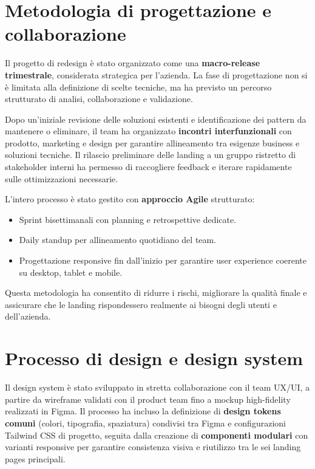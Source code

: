 \section{Metodologia di progettazione e collaborazione}
Il progetto di redesign è stato organizzato come una \textbf{macro-release trimestrale},
considerata strategica per l'azienda. La fase di progettazione non si è limitata
alla definizione di scelte tecniche, ma ha previsto un percorso strutturato di
analisi, collaborazione e validazione.

Dopo un'iniziale revisione delle soluzioni esistenti e identificazione dei 
pattern da mantenere o eliminare, il team ha organizzato \textbf{incontri 
interfunzionali} con prodotto, marketing e design per garantire allineamento 
tra esigenze business e soluzioni tecniche. Il rilascio preliminare delle 
landing a un gruppo ristretto di stakeholder interni ha permesso di raccogliere 
feedback e iterare rapidamente sulle ottimizzazioni necessarie.

L'intero processo è stato gestito con \textbf{approccio Agile} strutturato:

\begin{itemize}
  \item Sprint bisettimanali con planning e retrospettive dedicate.
  \item Daily standup per allineamento quotidiano del team.
  \item Progettazione responsive fin dall'inizio per garantire user experience 
        coerente su desktop, tablet e mobile.
\end{itemize}

Questa metodologia ha consentito di ridurre i rischi, migliorare la qualità
finale e assicurare che le landing rispondessero realmente ai bisogni degli utenti
e dell'azienda.

\section{Processo di design e design system}
Il design system è stato sviluppato in stretta collaborazione con il team UX/UI,
a partire da wireframe validati con il product team fino a mockup
high-fidelity realizzati in Figma. Il processo ha incluso la definizione di 
\textbf{design tokens comuni} (colori, tipografia, spaziatura) condivisi tra 
Figma e configurazioni Tailwind CSS di progetto, seguita dalla creazione di 
\textbf{componenti modulari} con varianti responsive per garantire consistenza 
visiva e riutilizzo tra le sei landing pages principali.

